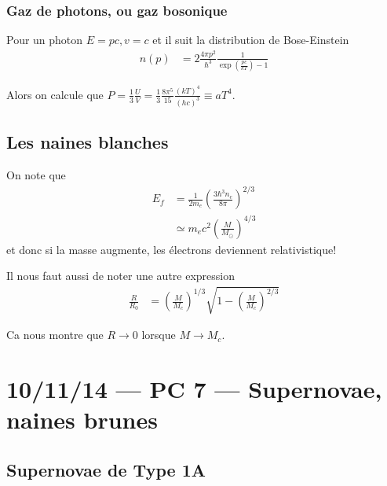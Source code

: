 \documentclass[10pt]{report}
\begin{document}
\subsection{Gaz de photons, ou gaz bosonique}

Pour un photon $E = pc, v=c$ et il suit la distribution de Bose-Einstein
\begin{align}
    n(p) &= 2\frac{4\pi p^2}{\hbar^3}\frac{1}{\exp\left( \frac{pc}{kT} \right) - 1}
\end{align}

Alors on calcule que $P = \frac{1}{3}\frac{U}{V} = \frac{1}{3}\frac{8\pi^5}{15}\frac{(kT)^4}{(hc)^3} \equiv a T^4$. 

\section{Les naines blanches}

On note que
\begin{align}
    E_f &= \frac{1}{2m_e}\left( \frac{3\hbar^3n_e}{8\pi} \right)^{2/3}\\
    &\simeq m_e c^2\left( \frac{M}{M_{\odot}} \right)^{4/3}
\end{align}
et donc si la masse augmente, les \'electrons deviennent relativistique!

Il nous faut aussi de noter une autre expression
\begin{align}
    \frac{R}{R_0} &= \left( \frac{M}{M_c} \right)^{1/3}\sqrt{1 - \left( \frac{M}{M_c} \right)^{2/3}}
\end{align}

Ca nous montre que $R \to 0$ lorsque $M \to M_c$. 
\chapter{10/11/14 --- PC 7 --- Supernovae, naines brunes}

\section{Supernovae de Type 1A}
\end{document}
